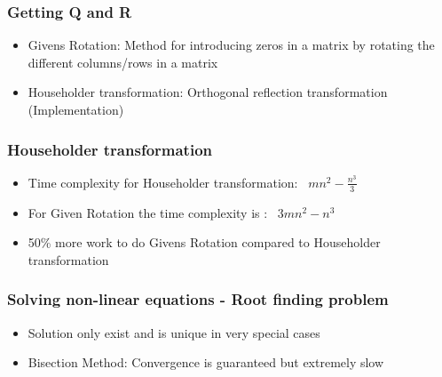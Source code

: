 \documentclass{beamer}
\begin{document}
\begin{frame}
\frametitle{Getting Q and R}

\begin{itemize}
\item Givens Rotation: Method for introducing zeros in a matrix by rotating the different columns/rows in a matrix
\item Householder transformation: Orthogonal reflection transformation  (Implementation)
\end{itemize}

\end{frame}



\begin{frame}
\frametitle{Householder transformation}

\begin{itemize}
\item Time complexity for Householder transformation: ~$mn^2 - \frac{n^3}{3}$
\item For Given Rotation the time complexity is : ~$3mn^2 - n^3$
\item 50\% more work to do Givens Rotation compared to Householder transformation
\end{itemize}

\end{frame}


\begin{frame}
\frametitle{Solving non-linear equations - Root finding problem}

\begin{itemize}
\item Solution only exist and is unique in very special cases 
\item Bisection Method: Convergence is guaranteed but extremely slow
\end{itemize}

\end{frame}
\end{document}
